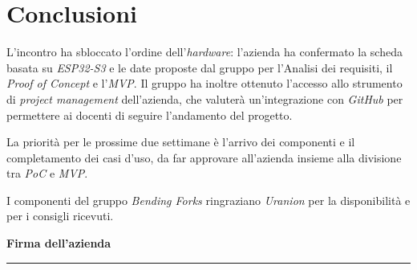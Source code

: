 \documentclass[12pt,a4paper]{article}
\begin{document}
\break
\section{Conclusioni}

L'incontro ha sbloccato l'ordine dell'\emph{hardware}: l'azienda ha confermato la scheda basata su \emph{ESP32-S3} e le date proposte dal gruppo per l'Analisi dei requisiti, il \emph{Proof of Concept} e l'\emph{MVP}. Il gruppo ha inoltre ottenuto l'accesso allo strumento di \emph{project management} dell'azienda, che valuterà un'integrazione con \emph{GitHub} per permettere ai docenti di seguire l'andamento del progetto.

La priorità per le prossime due settimane è l'arrivo dei componenti e il completamento dei casi d'uso, da far approvare all'azienda insieme alla divisione tra \emph{PoC} e \emph{MVP}.

I componenti del gruppo \emph{Bending Forks} ringraziano \emph{Uranion} per la disponibilità e per i consigli ricevuti.

\vspace{30pt}
\begin{flushright}
\textbf{Firma dell'azienda}\\[22pt]
\rule{60mm}{0.5pt}
\end{flushright}
\end{document}
